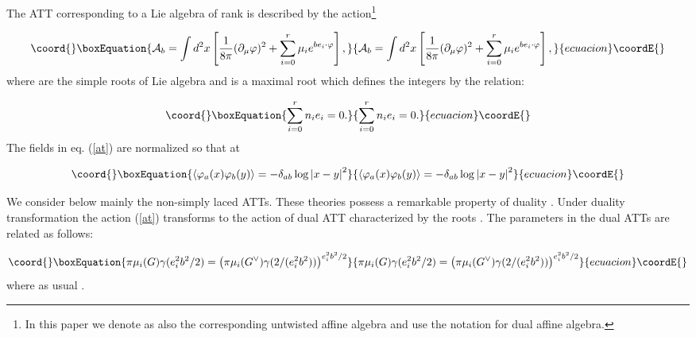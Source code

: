 \documentclass[a4paper,12pt,titlepage,final]{article}
\begin{document}
The ATT corresponding to a Lie algebra \coordHE{} of rank \coordHE{} is described by the
action\footnote{In this paper we denote as \coordHE{} also the corresponding
untwisted
affine algebra and use the notation \coordHE{} for dual affine algebra.}

\begin{equation}\coord{}\boxEquation{
\mathcal{A}_{b}=\int d^{2}x\left[ \frac{1}{8\pi }(\partial _{\mu }\varphi
)^{2}+\sum_{i=0}^{r}\mu _{i}e^{be_{i}\cdot \varphi }\right] ,  \label{at}
}{
\mathcal{A}_{b}=\int d^{2}x\left[ \frac{1}{8\pi }(\partial _{\mu }\varphi
)^{2}+\sum_{i=0}^{r}\mu _{i}e^{be_{i}\cdot \varphi }\right] ,  }{ecuacion}\coordE{}\end{equation}
where \coordHE{}  \coordHE{} are the simple roots of Lie algebra \coordHE{}
and \coordHE{} is a maximal root which defines the integers \coordHE{}
by the relation:

\begin{equation}\coord{}\boxEquation{
\sum_{i=0}^{r}n_{i}e_{i}=0.  \label{mr}
}{
\sum_{i=0}^{r}n_{i}e_{i}=0.  }{ecuacion}\coordE{}\end{equation}
The fields \myHighlight{$\varphi $}\coordHE{} in eq. (\ref{at}) are normalized so that at \coordHE{}

\begin{equation}\coord{}\boxEquation{
\left\langle \varphi _{a}(x) \varphi _{b}(y)\right\rangle =-\delta _{ab}\log
\left| x-y\right| ^{2}  \label{n}
}{
\left\langle \varphi _{a}(x) \varphi _{b}(y)\right\rangle =-\delta _{ab}\log
\left| x-y\right| ^{2}  }{ecuacion}\coordE{}\end{equation}

We consider below mainly the non-simply laced ATTs. These theories possess
a remarkable property of duality \cite{DGZ}.
Under duality transformation \coordHE{}
the action (\ref{at}) transforms to the action
of dual ATT characterized by the roots \coordHE{}. The parameters \coordHE{} in the dual ATTs are
related as follows:

\begin{equation}\coord{}\boxEquation{
\pi \mu _{i}(G)\gamma (e_{i}^{2}b^{2}/2)=\left( \pi \mu _{i}(G^{\vee
})\gamma (2/(e_{i}^{2}b^{2}))\right) ^{e_{i}^{2}b^{2}/2}  \label{mumu}
}{
\pi \mu _{i}(G)\gamma (e_{i}^{2}b^{2}/2)=\left( \pi \mu _{i}(G^{\vee
})\gamma (2/(e_{i}^{2}b^{2}))\right) ^{e_{i}^{2}b^{2}/2}  }{ecuacion}\coordE{}\end{equation}
where as usual \coordHE{}.
\end{document}
